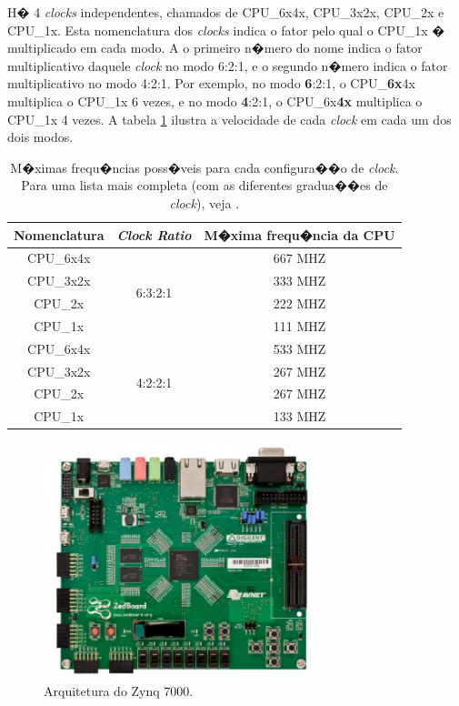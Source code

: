 \documentclass{ufscThesis/ufscThesis} %
\begin{document}
H� 4 \emph{clocks} independentes, chamados de CPU\_6x4x, CPU\_3x2x, CPU\_2x e CPU\_1x. Esta nomenclatura dos \emph{clocks} indica o fator pelo qual o CPU\_1x � multiplicado em cada modo.
A o primeiro n�mero do nome indica o fator multiplicativo daquele \emph{clock} no modo 6:2:1, e o segundo n�mero indica o fator multiplicativo no modo 4:2:1.
Por exemplo, no modo \textbf{6}:2:1, o CPU\_\textbf{6x}4x multiplica o CPU\_1x 6 vezes, e no modo \textbf{4}:2:1, o CPU\_6x\textbf{4x} multiplica o CPU\_1x 4 vezes. A tabela \ref{tab:clocks} ilustra a velocidade de cada \emph{clock} em cada um dos dois modos.

\begin{table}[ht]
	\centering
	\begin{tabular}{ccc}
		\hline\hline
		Nomenclatura & \emph{Clock Ratio} & M�xima frequ�ncia da CPU\\[0.5ex]
		\hline
		CPU\_6x4x & \multirow{4}{*}{6:3:2:1} & 667 MHZ\\
		CPU\_3x2x &                          & 333 MHZ\\
		CPU\_2x   &                          & 222 MHZ\\
		CPU\_1x   &                          & 111 MHZ\\
		\hline
		CPU\_6x4x & \multirow{4}{*}{4:2:2:1} & 533 MHZ\\
		CPU\_3x2x &                          & 267 MHZ\\
		CPU\_2x   &                          & 267 MHZ\\
		CPU\_1x   &                          & 133 MHZ\\[1ex]
		\hline
	\end{tabular}
	\caption{M�ximas frequ�ncias poss�veis para cada configura��o de \emph{clock}. Para uma lista mais completa (com as diferentes gradua��es de \emph{clock}), veja \cite[p.~13]{data_sheet}.}
	\label{tab:clocks}
\end{table}

\begin{figure}[ht!]
    \centering
    \includegraphics[width=8cm]{figuras/zedboard}
	\caption{Arquitetura do Zynq 7000.}
\end{figure}
\end{document}
